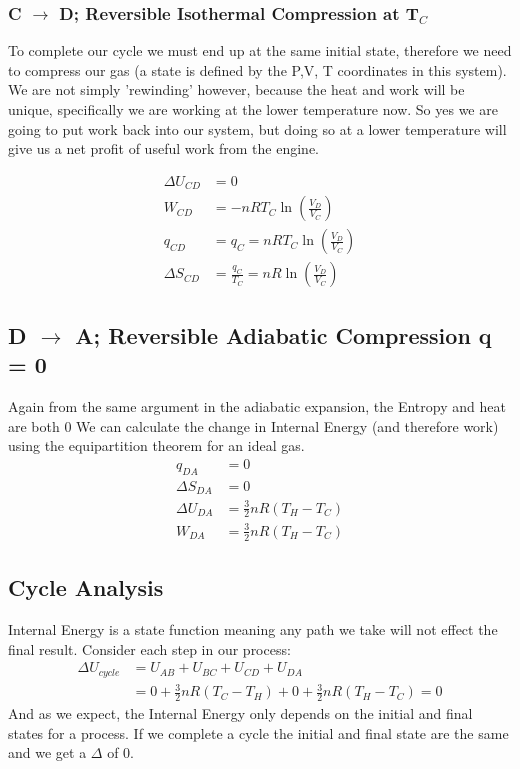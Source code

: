 \documentclass{article}
\newcommand{\be}{\begin{equation}}
\newcommand{\ee}{\end{equation}}
\begin{document}
\subsubsection*{C $\rightarrow$ D; Reversible Isothermal Compression at T$_C$}
To complete our cycle we must end up at the same initial state, therefore we need to compress our gas (a state is defined by the P,V, T coordinates in this system). 
We are not simply 'rewinding' however, because the heat and work will be unique, specifically we are working at the lower temperature now. 
So yes we are going to put work back into our system, but doing so at a lower temperature will give us a net profit of useful work from the engine.  

\be
\begin{split}
\Delta U_{CD} &= 0 \\
W_{CD} &= -nRT_C\ln\left(\frac{V_D}{V_C}\right) \\
q_{CD} &= q_C = nRT_C\ln\left(\frac{V_D}{V_C}\right) \\
\Delta S_{CD} &= \frac{q_C}{T_C} = nR\ln\left(\frac{V_D}{V_C}\right)
\end{split}
\ee

\subsection*{D $\rightarrow$ A; Reversible Adiabatic Compression q = 0}
Again from the same argument in the adiabatic expansion, the Entropy and heat are both 0
We can calculate the change in Internal Energy (and therefore work) using the equipartition theorem for an ideal gas. 
\be
\begin{split}
    q_{DA} &= 0 \\
    \Delta S_{DA} &= 0\\
    \Delta U_{DA} &= \frac{3}{2} nR(T_H-T_C)\\
    W_{DA} &= \frac{3}{2} nR(T_H-T_C)
    \end{split}
\ee

\subsection*{Cycle Analysis}
Internal Energy is a state function meaning any path we take will not effect the final result.
Consider each step in our process:
\be
\begin{split}
\Delta U_{cycle} &= U_{AB} + U_{BC} + U_{CD} + U_{DA} \\
& = 0 + \frac{3}{2}nR(T_C-T_H) + 0 + \frac{3}{2}nR(T_H-T_C) = 0
\end{split}
\ee
And as we expect, the Internal Energy only depends on the initial and final states for a process.
If we complete a cycle the initial and final state are the same and we get a $\Delta$ of 0. 
\end{document}
